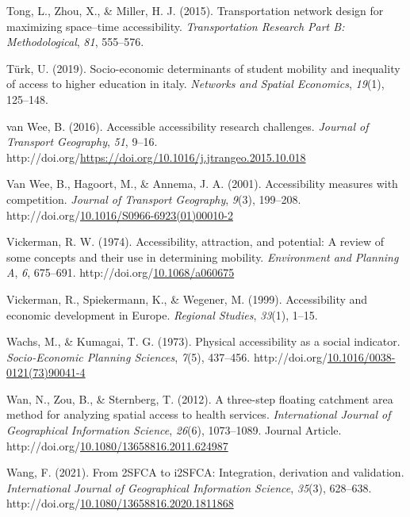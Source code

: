\documentclass[
11pt, %
oneside, %
english, %
singlespacing, %
]{macthesis} %
\newlength{\cslhangindent}
\newenvironment{CSLReferences}[2] %
{\begin{list}{}{%
	\setlength{\itemindent}{0pt}
	\setlength{\leftmargin}{0pt}
	\setlength{\parsep}{0pt}
	\ifodd #1
	\setlength{\leftmargin}{\cslhangindent}
	\setlength{\itemindent}{-1\cslhangindent}
	\fi
	\setlength{\itemsep}{#2\baselineskip}}}
{\end{list}}
\begin{document}
\begin{CSLReferences}{1}{0}
Tong, L., Zhou, X., \& Miller, H. J. (2015). Transportation network design for maximizing space--time accessibility. \emph{Transportation Research Part B: Methodological}, \emph{81}, 555--576.

Türk, U. (2019). Socio-economic determinants of student mobility and inequality of access to higher education in italy. \emph{Networks and Spatial Economics}, \emph{19}(1), 125--148.

van Wee, B. (2016). Accessible accessibility research challenges. \emph{Journal of Transport Geography}, \emph{51}, 9--16. http://doi.org/\url{https://doi.org/10.1016/j.jtrangeo.2015.10.018}

Van Wee, B., Hagoort, M., \& Annema, J. A. (2001). Accessibility measures with competition. \emph{Journal of Transport Geography}, \emph{9}(3), 199--208. http://doi.org/\href{https://doi.org/10.1016/S0966-6923(01)00010-2}{10.1016/S0966-6923(01)00010-2}

Vickerman, R. W. (1974). Accessibility, attraction, and potential: A review of some concepts and their use in determining mobility. \emph{Environment and Planning A}, \emph{6}, 675--691. http://doi.org/\href{https://doi.org/10.1068/a060675}{10.1068/a060675}

Vickerman, R., Spiekermann, K., \& Wegener, M. (1999). Accessibility and economic development in {Europe}. \emph{Regional Studies}, \emph{33}(1), 1--15.

Wachs, M., \& Kumagai, T. G. (1973). Physical accessibility as a social indicator. \emph{Socio-Economic Planning Sciences}, \emph{7}(5), 437--456. http://doi.org/\href{https://doi.org/10.1016/0038-0121(73)90041-4}{10.1016/0038-0121(73)90041-4}

Wan, N., Zou, B., \& Sternberg, T. (2012). A three-step floating catchment area method for analyzing spatial access to health services. \emph{International Journal of Geographical Information Science}, \emph{26}(6), 1073--1089. Journal Article. http://doi.org/\href{https://doi.org/10.1080/13658816.2011.624987}{10.1080/13658816.2011.624987}

Wang, F. (2021). From {2SFCA} to {i2SFCA}: Integration, derivation and validation. \emph{International Journal of Geographical Information Science}, \emph{35}(3), 628--638. http://doi.org/\href{https://doi.org/10.1080/13658816.2020.1811868}{10.1080/13658816.2020.1811868}


\end{CSLReferences}
\end{document}
